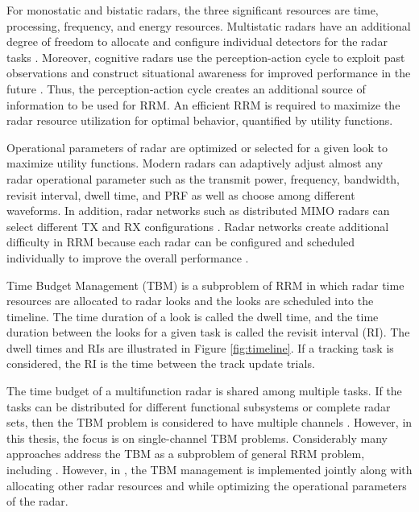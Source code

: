 \documentclass[english, 12pt, a4paper, elec, utf8, a-1b, online]{aaltothesis}
\begin{document}
For monostatic and bistatic radars, the three significant resources are time, processing, frequency, and energy resources. 
Multistatic radars have an additional degree of freedom to allocate and configure individual detectors for the radar tasks \cite{Moo2016}. 
Moreover, cognitive radars use the perception-action cycle to exploit past observations and construct situational awareness for improved performance in the future \cite{Haykin2006}. 
Thus, the perception-action cycle creates an additional source of information to be used for RRM.
An efficient RRM is required to maximize the radar resource utilization for optimal behavior, quantified by utility functions. 

Operational parameters of radar are optimized or selected for a given look to maximize utility functions. 
Modern radars can adaptively adjust almost any radar operational parameter such as the transmit power, frequency, bandwidth, revisit interval, dwell time, and PRF as well as choose among different waveforms.
In addition, radar networks such as distributed MIMO radars can select different TX and RX configurations \cite{Godrich2011a, Godrich2011, Sun2014}.
Radar networks create additional difficulty in RRM because each radar can be configured and scheduled individually to improve the overall performance \cite{Sun2014}.

Time Budget Management (TBM) is a subproblem of RRM in which radar time resources are allocated to radar looks and the looks are scheduled into the timeline. 
The time duration of a look is called the dwell time, and the time duration between the looks for a given task is called the revisit interval (RI). 
The dwell times and RIs are illustrated in Figure \ref{fig:timeline}. 
If a tracking task is considered, the RI is the time between the track update trials. 

The time budget of a multifunction radar is shared among multiple tasks.
If the tasks can be distributed for different functional subsystems or complete radar sets, then the TBM problem is considered to have multiple channels \cite{Shaghaghi2018}.
However, in this thesis, the focus is on single-channel TBM problems.
Considerably many approaches address the TBM as a subproblem of general RRM problem, including \cite{Koch1999, Wintenby2006, Byrne2016, Xu2010}. 
However, in \cite{Rajkumar1997, Irci2010, Charlish2015a}, the TBM management is implemented jointly along with allocating other radar resources and while optimizing the operational parameters of the radar.
\end{document}
